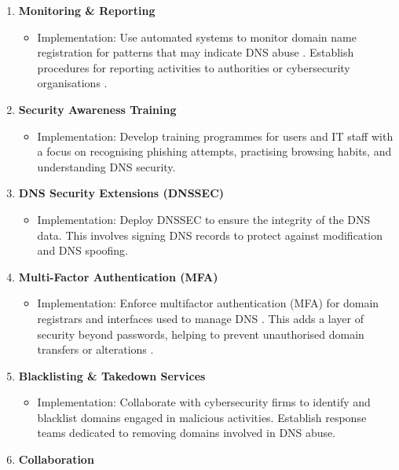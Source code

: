 \begin{enumerate}
    \item \textbf{Monitoring \& Reporting}
    \begin{itemize}
        \item Implementation: Use automated systems to monitor domain name registration for patterns that may indicate DNS abuse \cite{icannndnssec}. Establish procedures for reporting activities to authorities or cybersecurity organisations \cite{lucas2021tls}.
    \end{itemize}
    \item \textbf{Security Awareness Training}
    \begin{itemize}
        \item Implementation: Develop training programmes for users and IT staff with a focus on recognising phishing attempts, practising browsing habits, and understanding DNS security.
    \end{itemize}
    \item \textbf{DNS Security Extensions (DNSSEC)}
    \begin{itemize}
        \item Implementation: Deploy DNSSEC to ensure the integrity of the DNS data. This involves signing DNS records to protect against modification and DNS spoofing.
    \end{itemize}
    \item \textbf{Multi-Factor Authentication (MFA)}
    \begin{itemize}
        \item Implementation: Enforce multifactor authentication (MFA) for domain registrars and interfaces used to manage DNS \cite{icannndnssec}. This adds a layer of security beyond passwords, helping to prevent unauthorised domain transfers or alterations \cite{moghaddam2014ecco}.
    \end{itemize}
    \item \textbf{Blacklisting \& Takedown Services}
    \begin{itemize}
        \item Implementation: Collaborate with cybersecurity firms to identify and blacklist domains engaged in malicious activities. Establish response teams dedicated to removing domains involved in DNS abuse.
    \end{itemize}
    \vspace{20px}
    \item \textbf{Collaboration}
    \begin{itemize}

\end{itemize}
\end{enumerate}
